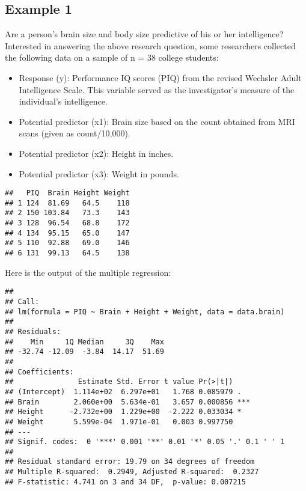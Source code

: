 \documentclass[12pt]{article}\usepackage[]{graphicx}\usepackage[]{color}
\makeatletter
\newenvironment{kframe}{%
 \def\at@end@of@kframe{}%
 \ifinner\ifhmode%
  \def\at@end@of@kframe{\end{minipage}}%
  \begin{minipage}{\columnwidth}%
 \fi\fi%
 \def\FrameCommand##1{\hskip\@totalleftmargin \hskip-\fboxsep
 \colorbox{shadecolor}{##1}\hskip-\fboxsep
     \hskip-\linewidth \hskip-\@totalleftmargin \hskip\columnwidth}%
 \MakeFramed {\advance\hsize-\width
   \@totalleftmargin\z@ \linewidth\hsize
   \@setminipage}}%
 {\par\unskip\endMakeFramed%
 \at@end@of@kframe}
\newenvironment{knitrout}{}{} %
\makeatother
\begin{document}


\subsection{Example 1}

Are a person's brain size and body size predictive of his or her intelligence?
Interested in answering the above research question, some researchers collected the following data on a sample of n = 38 college students:
\begin{itemize}
  \item Response (y): Performance IQ scores (PIQ) from the revised Wechsler Adult Intelligence Scale. This variable served as the investigator's measure of the individual's intelligence.
  \item Potential predictor (x1): Brain size based on the count obtained from MRI scans (given as count/10,000).
  \item Potential predictor (x2): Height in inches.
  \item Potential predictor (x3): Weight in pounds.
\end{itemize}


\begin{knitrout}
\color{fgcolor}\begin{kframe}
\begin{verbatim}
##   PIQ  Brain Height Weight
## 1 124  81.69   64.5    118
## 2 150 103.84   73.3    143
## 3 128  96.54   68.8    172
## 4 134  95.15   65.0    147
## 5 110  92.88   69.0    146
## 6 131  99.13   64.5    138
\end{verbatim}
\end{kframe}
\end{knitrout}

Here is the output of the multiple regression:
\begin{knitrout}
\color{fgcolor}\begin{kframe}
\begin{verbatim}
## 
## Call:
## lm(formula = PIQ ~ Brain + Height + Weight, data = data.brain)
## 
## Residuals:
##    Min     1Q Median     3Q    Max 
## -32.74 -12.09  -3.84  14.17  51.69 
## 
## Coefficients:
##               Estimate Std. Error t value Pr(>|t|)    
## (Intercept)  1.114e+02  6.297e+01   1.768 0.085979 .  
## Brain        2.060e+00  5.634e-01   3.657 0.000856 ***
## Height      -2.732e+00  1.229e+00  -2.222 0.033034 *  
## Weight       5.599e-04  1.971e-01   0.003 0.997750    
## ---
## Signif. codes:  0 '***' 0.001 '**' 0.01 '*' 0.05 '.' 0.1 ' ' 1
## 
## Residual standard error: 19.79 on 34 degrees of freedom
## Multiple R-squared:  0.2949,	Adjusted R-squared:  0.2327 
## F-statistic: 4.741 on 3 and 34 DF,  p-value: 0.007215
\end{verbatim}
\end{kframe}
\end{knitrout}
\end{document}
